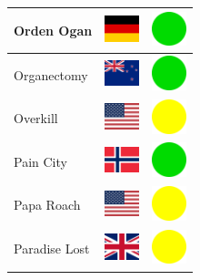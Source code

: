 \documentclass[12pt, a4paper, twoside]{report}
\begin{document}
\begin{center}
\begin{longtable}{|p{5cm}|p{2cm}|p{2cm}|}
Orden Ogan & \includegraphics[width=1cm]{4x3/de} & \includegraphics[width=1cm]{likes/y} \\ \hline
Organectomy & \includegraphics[width=1cm]{4x3/nz} & \includegraphics[width=1cm]{likes/y} \\ \hline
Overkill & \includegraphics[width=1cm]{4x3/us} & \includegraphics[width=1cm]{likes/m} \\ \hline
Pain City & \includegraphics[width=1cm]{4x3/no} & \includegraphics[width=1cm]{likes/y} \\ \hline
Papa Roach & \includegraphics[width=1cm]{4x3/us} & \includegraphics[width=1cm]{likes/m} \\ \hline
Paradise Lost & \includegraphics[width=1cm]{4x3/gb} & \includegraphics[width=1cm]{likes/m} \\ \hline

\end{longtable}
\end{center}
\end{document}
